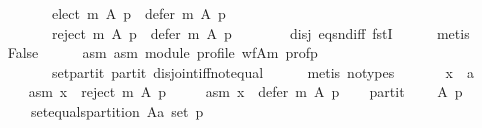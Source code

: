 \begin{isabellebody}
\ \ \ \ \ \ \ \ \ \ {\isacharparenleft}{\kern0pt}{\isacharparenleft}{\kern0pt}elect\ m\ A\ p{\isacharparenright}{\kern0pt}\ {\isasyminter}\ {\isacharparenleft}{\kern0pt}defer\ m\ A\ p{\isacharparenright}{\kern0pt}\ {\isacharequal}{\kern0pt}\ {\isacharbraceleft}{\kern0pt}{\isacharbraceright}{\kern0pt}{\isacharparenright}{\kern0pt}\ {\isasymand}\isanewline
\ \ \ \ \ \ \ \ \ \ {\isacharparenleft}{\kern0pt}{\isacharparenleft}{\kern0pt}reject\ m\ A\ p{\isacharparenright}{\kern0pt}\ {\isasyminter}\ {\isacharparenleft}{\kern0pt}defer\ m\ A\ p{\isacharparenright}{\kern0pt}\ {\isacharequal}{\kern0pt}\ {\isacharbraceleft}{\kern0pt}{\isacharbraceright}{\kern0pt}{\isacharparenright}{\kern0pt}{\isachardoublequoteclose}\isanewline
\ \ \ \ \isamarkupfalse%
\ disj{}\ eq{\isacharunderscore}{\kern0pt}snd{\isacharunderscore}{\kern0pt}iff\ fstI\isanewline
\ \ \ \ \isamarkupfalse%
\ metis\isanewline
\ \ \isamarkupfalse%
\ {\isachardoublequoteopen}False{\isachardoublequoteclose}\isanewline
\ \ \ \ \isamarkupfalse%
\ asm{}\ asm{}\ module\ profile\ wf{\isacharunderscore}{\kern0pt}A{\isacharunderscore}{\kern0pt}m\ prof{\isacharunderscore}{\kern0pt}p\isanewline
\ \ \ \ \ \ \ \ \ \ set{\isacharunderscore}{\kern0pt}partit\ partit\ disjoint{\isacharunderscore}{\kern0pt}iff{\isacharunderscore}{\kern0pt}not{\isacharunderscore}{\kern0pt}equal\isanewline
\ \ \ \ \isamarkupfalse%
\ {\isacharparenleft}{\kern0pt}metis\ {\isacharparenleft}{\kern0pt}no{\isacharunderscore}{\kern0pt}types{\isacharparenright}{\kern0pt}{\isacharparenright}{\kern0pt}\isanewline
{}\isamarkupfalse%
\isanewline
\ \ \isamarkupfalse%
\isanewline
\ \ \ \ x\ {\isacharcolon}{\kern0pt}{\isacharcolon}{\kern0pt}\ {\isachardoublequoteopen}{\isacharprime}{\kern0pt}a{\isachardoublequoteclose}\isanewline
\ \ \isamarkupfalse%
\isanewline
\ \ \ \ asm{}{\isacharcolon}{\kern0pt}\ {\isachardoublequoteopen}x\ {\isasymin}\ reject\ m\ A\ p{\isachardoublequoteclose}\ \isanewline
\ \ \ \ asm{}{\isacharcolon}{\kern0pt}\ {\isachardoublequoteopen}x\ {\isasymin}\ defer\ m\ A\ p{\isachardoublequoteclose}\isanewline
\ \ \isamarkupfalse%
\ partit{\isacharcolon}{\kern0pt}\isanewline
\ \ \ \ {\isachardoublequoteopen}{\isasymforall}A\ p{\isachardot}{\kern0pt}\isanewline
\ \ \ \ \ \ {\isasymnot}\ set{\isacharunderscore}{\kern0pt}equals{\isacharunderscore}{\kern0pt}partition\ {\isacharparenleft}{\kern0pt}A{\isacharcolon}{\kern0pt}{\isacharcolon}{\kern0pt}{\isacharprime}{\kern0pt}a\ set{\isacharparenright}{\kern0pt}\ p\ {\isasymor}\isanewline

\end{isabellebody}
